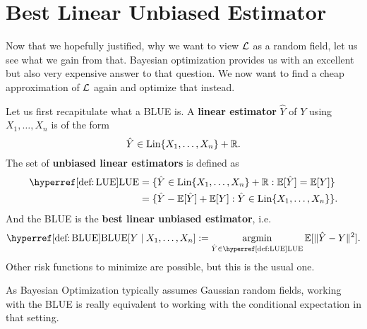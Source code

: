 \section{Best Linear Unbiased Estimator}

Now that we hopefully justified, why we want to view \(\mathcal{L}\) as a random field,
let us see what we gain from that. Bayesian optimization provides us with
an excellent but also very expensive answer to that question. We now want to
find a cheap approximation of \(\mathcal{L}\) again and optimize that instead.

Let us first recapitulate what a BLUE is. A \textbf{linear estimator}
\(\hat{Y}\) of \(Y\) using \(X_1,\dots,X_n\) is of the form 
\begin{equation*}
	\hat{Y}\in \operatorname{Lin}\{X_1,\dots,X_n\} + \mathbb{R}.
\end{equation*}
The set of \textbf{unbiased linear estimators} is defined as
\begin{align}\label{def: LUE}
	\LUE
	&= \{ \hat{Y} \in \linHull\{X_1,\dots,X_n\} + \real : \E[\hat{Y}] = \E[Y]\}\\
	\nonumber
	&= \{ \hat{Y} - \E[\hat{Y}] + \E[Y] : \hat{Y} \in \linHull\{X_1,\dots,X_n\}\}.
\end{align}
And the BLUE is the \textbf{best linear unbiased estimator}, i.e.
\begin{equation}\label{def: BLUE}
	\BLUE[Y\mid X_1,\dots, X_n] := \argmin_{\hat{Y}\in\LUE} \E[\|\hat{Y} - Y\|^2].
\end{equation}
Other risk functions to minimize are possible, but this is the usual one.


\begin{remark}
	As Bayesian Optimization typically assumes Gaussian random fields, working with
	the BLUE is really equivalent to working with the conditional expectation in
	that setting.
\end{remark}

